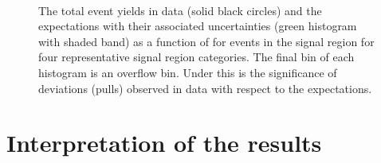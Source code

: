 \begin{figure}[tbhp]
\begin{center}
{    }~~
  \end{center}
  \caption{The total event yields in data (solid black circles) and
  the \SM expectations with their associated uncertainties (green
  histogram with shaded band) as a function of \MHT for events in the
  signal region for four representative signal region categories. The
  final bin of each histogram is an overflow bin. Under this is the
  significance of deviations (pulls) observed in data with respect to
  the \SM expectations. \label{fig:mht-templates} 
  }
\end{figure}


\section{Interpretation of the results}
\label{sec:signalModel}



